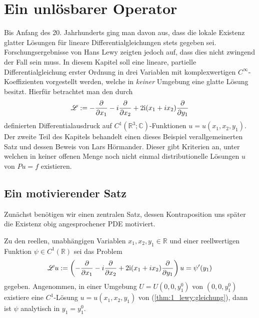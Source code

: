 \chapter{Ein unlösbarer Operator}
\cite{Lewy:1957}
\cite{Hormander:1960b}

Bis Anfang des 20. Jahrhunderts ging man davon aus, dass die lokale Existenz glatter Lösungen für lineare Differentialgleichungen stets gegeben sei. Forschungsergebnisse von Hans Lewy zeigten jedoch auf, dass dies nicht zwingend der Fall sein muss.  In diesem Kapitel soll eine lineare, partielle Differentialgleichung erster Ordnung in drei Variablen mit komplexwertigen $C^\infty$-Koeffizienten vorgestellt werden, welche in \textit{keiner} Umgebung eine glatte Lösung besitzt. Hierfür betrachtet man den durch
\begin{equation}\label{lewy:differentialausdruck}
\mathscr L := -\frac{\partial}{\partial x_1} -i\frac{\partial}{\partial x_2} +2\mathrm i(x_1+ix_2)\frac{\partial}{\partial y_1}
\end{equation}
definierten Differentialausdruck auf $C^1(\mathbb{R}^3;\mathbb{C})$-Funktionen $u=u(x_1,x_2,y_1)$. Der zweite Teil des Kapitels behandelt einen dieses Beispiel verallgemeinerten Satz und dessen Beweis von Lars Hörmander. Dieser gibt Kriterien an, unter welchen in keiner offenen Menge noch nicht einmal distributionelle Lösungen $u$ von $Pu=f$ existieren.

\section{Ein motivierender Satz}

Zunächst benötigen wir einen zentralen Satz, dessen Kontraposition uns später die Existenz obig angesprochener PDE motiviert.

\begin{thm}\label{thm:1_lewy}
Zu den reellen, unabhängigen Variablen $x_1,x_2,y_1\in\mathbb{R}$ und einer reellwertigen Funktion $\psi\in C^1(\mathbb{R})$ sei das Problem
\begin{equation}\label{thm:1_lewy:gleichung}
\mathscr Lu:= \left(-\frac{\partial}{\partial x_1} -i\frac{\partial}{\partial x_2} +2\mathrm i(x_1+ix_2)\frac{\partial}{\partial y_1}\right)u=\psi'(y_1)
\end{equation}
gegeben. Angenommen, in einer Umgebung $U=U(0,0,y_1^0)$ von $(0,0,y_1^0)$ existiere eine $C^1$-Lösung $u=u(x_1,x_2,y_1)$ von (\ref{thm:1_lewy:gleichung}), dann ist $\psi$ analytisch in $y_1=y_1^0$.
\end{thm}

